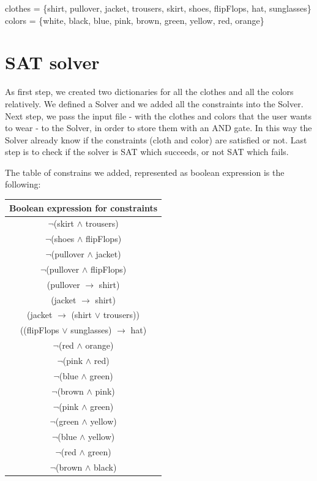 \documentclass[12pt]{article}
\begin{document}
\begin{center}
	clothes = \{shirt, pullover, jacket, trousers, skirt, shoes, flipFlops, hat, sunglasses\}\\
	colors = \{white, black, blue, pink, brown, green, yellow, red, orange\}
\end{center}


\section{SAT solver}

As first step, we created two dictionaries for all the clothes and all the colors relatively. We defined a Solver and we added all the constraints into the Solver. Next step, we pass the input file - with the clothes and colors that the user wants to wear - to the Solver, in order to store them with an AND gate. In this way the Solver already know if the constraints (cloth and color) are satisfied or not. Last step is to check if the solver is SAT which succeeds, or not SAT which fails.  

The table of constrains we added, represented as boolean expression is the following:


\begin{center}
\begin{tabular}{|c|}
\hline
Boolean expression for constraints \\[0.1cm]
\hline 
$\neg$(skirt $\wedge$ trousers) \\[0.2cm]
$\neg$(shoes $\wedge$ flipFlops) \\[0.2cm]
$\neg$(pullover $\wedge$ jacket) \\[0.2cm]
$\neg$(pullover $\wedge$ flipFlops) \\[0.2cm]

(pullover $\rightarrow$ shirt) \\[0.2cm]
(jacket $\rightarrow$ shirt) \\[0.2cm]
(jacket $\rightarrow$ (shirt $\lor$ trousers)) \\[0.2cm]
((flipFlops $\lor$ sunglasses)  $\rightarrow$ hat)\\[0.2cm]
$\neg$(red $\wedge$ orange) \\[0.2cm]
$\neg$(pink $\wedge$ red) \\[0.2cm]
$\neg$(blue $\wedge$ green) \\[0.2cm]
$\neg$(brown $\wedge$ pink) \\[0.2cm]
$\neg$(pink $\wedge$ green) \\[0.2cm]
$\neg$(green $\wedge$ yellow) \\[0.2cm]
$\neg$(blue $\wedge$ yellow) \\[0.2cm]
$\neg$(red $\wedge$ green) \\[0.2cm]
$\neg$(brown $\wedge$ black) \\[0.2cm]

\hline
\end{tabular}
\end{center}
\end{document}

